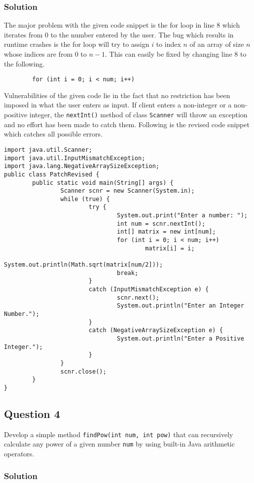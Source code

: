 \subsubsection*{Solution}
The major problem with the given code snippet is the for loop in line 8 which iterates from 0 to the number entered by the user. The bug which results in runtime crashes is the for loop will try to assign $i$ to index $n$ of an array of size $n$ whose indices are from 0 to $n-1$. This can easily be fixed by changing line 8 to the following.
\lstset{language=java, tabsize=2, firstnumber=8}
\begin{lstlisting}
		for (int i = 0; i < num; i++)
\end{lstlisting}

Vulnerabilities of the given code lie in the fact that no restriction has been imposed in what the user enters as input. If client enters a non-integer or a non-positive integer, the \texttt{nextInt()} method of class \texttt{Scanner} will throw an exception and no effort has been made to catch them. Following is the revised code snippet which catches all possible errors.

\lstset{language=java, tabsize=2, firstnumber=1}
\begin{lstlisting}
import java.util.Scanner;
import java.util.InputMismatchException;
import java.lang.NegativeArraySizeException;
public class PatchRevised {
		public static void main(String[] args) {
				Scanner scnr = new Scanner(System.in);
				while (true) {
						try {
								System.out.print("Enter a number: ");
								int num = scnr.nextInt();
								int[] matrix = new int[num];
								for (int i = 0; i < num; i++)
										matrix[i] = i;
								System.out.println(Math.sqrt(matrix[num/2]));
								break;
						}
						catch (InputMismatchException e) {
								scnr.next();
								System.out.println("Enter an Integer Number.");
						}
						catch (NegativeArraySizeException e) {
								System.out.println("Enter a Positive Integer.");
						}
				}
				scnr.close();
		}
}
\end{lstlisting}

\subsection*{Question 4}
Develop a simple method \texttt{findPow(int num, int pow)} that can recursively calculate any power of a given number \texttt{num} by using built-in Java arithmetic operators.

\subsubsection*{Solution}

